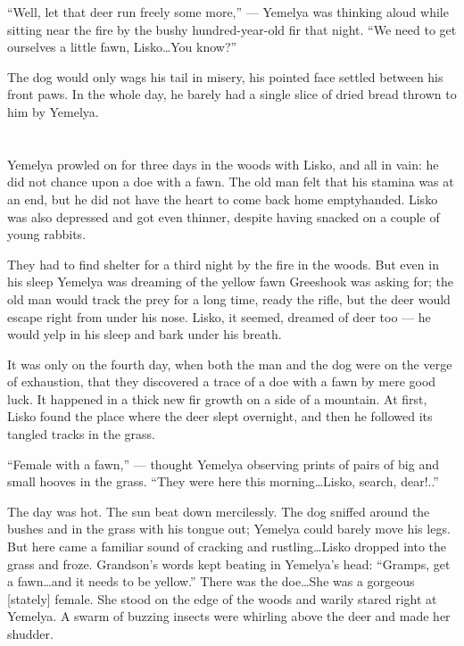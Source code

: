 \documentclass[b5paper,12pt,openany]{book}
\begin{document}
``Well, let that deer run freely some more,'' --- Yemelya was thinking aloud while sitting near the fire by the bushy hundred-year-old fir that night. ``We need to get ourselves a little fawn, Lisko\ldots You know?''

The dog would only wags his tail in misery, his pointed face settled between his front paws. In the whole day, he barely had a single slice of dried bread thrown to him by Yemelya.

\section{}

Yemelya prowled on for three days in the woods with Lisko, and all in vain: he did not chance upon a doe with a fawn. The old man felt that his stamina was at an end, but he did not have the heart to come back home emptyhanded. Lisko was also depressed and got even thinner, despite having snacked on a couple of young rabbits.

They had to find shelter for a third night by the fire in the woods. But even in his sleep Yemelya was dreaming of the yellow fawn Greeshook was asking for; the old man would track the prey for a long time, ready the rifle, but the deer would escape right from under his nose. Lisko, it seemed, dreamed of deer too --- he would yelp in his sleep and bark under his breath.

It was only on the fourth day, when both the man and the dog were on the verge of exhaustion, that they discovered a trace of a doe with a fawn by mere good luck. It happened in a thick new fir growth on a side of a mountain. At first, Lisko found the place where the deer slept overnight, and then he followed its tangled tracks in the grass.

``Female with a fawn,'' --- thought Yemelya observing prints of pairs of big and small hooves in the grass. ``They were here this morning\ldots Lisko, search, dear!..''

The day was hot. The sun beat down mercilessly. The dog sniffed around the bushes and in the grass with his tongue out; Yemelya could barely move his legs. But here came a familiar sound of cracking and rustling\ldots Lisko dropped into the grass and froze. Grandson's words kept beating in Yemelya's head: ``Gramps, get a fawn\ldots and it needs to be yellow.'' There was the doe\ldots She was a gorgeous [stately] female. She stood on the edge of the woods and warily stared right at Yemelya. A swarm of buzzing insects were whirling above the deer and made her shudder.
\end{document}

